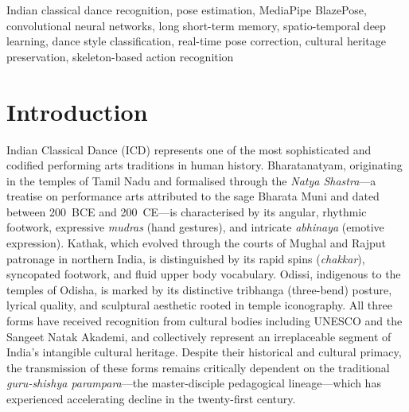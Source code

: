 \documentclass[journal]{IEEEtran}
\begin{document}
\begin{IEEEkeywords}
Indian classical dance recognition, pose estimation, MediaPipe
BlazePose, convolutional neural networks, long short-term memory,
spatio-temporal deep learning, dance style classification, real-time
pose correction, cultural heritage preservation, skeleton-based action
recognition
\end{IEEEkeywords}

\section{Introduction}
\label{sec:introduction}

Indian Classical Dance (ICD) represents one of the most sophisticated
and codified performing arts traditions in human history. Bharatanatyam,
originating in the temples of Tamil Nadu and formalised through the
\textit{Natya Shastra}—a treatise on performance arts attributed to
the sage Bharata Muni and dated between 200~BCE and 200~CE—is
characterised by its angular, rhythmic footwork, expressive
\textit{mudras} (hand gestures), and intricate \textit{abhinaya}
(emotive expression). Kathak, which evolved through the courts of
Mughal and Rajput patronage in northern India, is distinguished by its
rapid spins (\textit{chakkar}), syncopated footwork, and fluid upper
body vocabulary. Odissi, indigenous to the temples of Odisha, is
marked by its distinctive tribhanga (three-bend) posture, lyrical
quality, and sculptural aesthetic rooted in temple iconography.
All three forms have received recognition from cultural bodies
including UNESCO and the Sangeet Natak Akademi, and collectively
represent an irreplaceable segment of India's intangible cultural
heritage. Despite their historical and cultural primacy, the
transmission of these forms remains critically dependent on the
traditional \textit{guru-shishya parampara}—the master-disciple
pedagogical lineage—which has experienced accelerating decline in
the twenty-first century.
\end{document}
